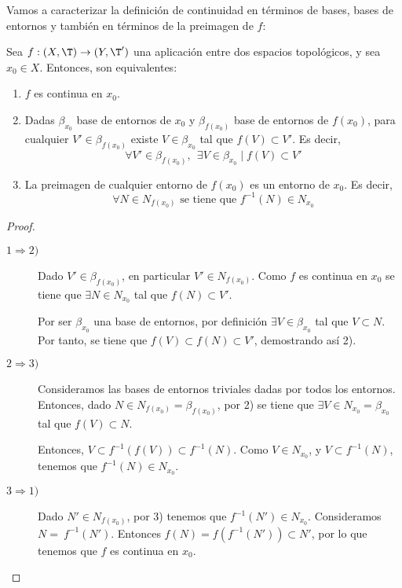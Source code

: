 Vamos a caracterizar la definición de continuidad en términos de bases, bases de entornos y también en términos de la preimagen de $f$:
\begin{prop}\label{prop:Caract_ContinuidadPto}
    Sea $f:(X,\T)\to (Y,\T')$ una aplicación entre dos espacios topológicos, y sea $x_0\in X$. Entonces, son equivalentes:
    \begin{enumerate}
        \item $f$ es continua en $x_0$.
        \item Dadas $\beta_{x_0}$ base de entornos de $x_0$ y $\beta_{f(x_0)}$ base de entornos de $f(x_0)$, para cualquier $V'\in \beta_{f(x_0)}$ existe $V\in \beta_{x_0}$ tal que $f(V)\subset V'$. Es decir,
        \begin{equation*}
            \forall V'\in \beta_{f(x_0)},~~\exists V\in \beta_{x_0} \mid f(V)\subset V'
        \end{equation*}
        \item La preimagen de cualquier entorno de $f(x_0)$ es un entorno de $x_0$. Es decir,
        \begin{equation*}
            \forall N\in N_{f(x_0)}\text{ se tiene que } f^{-1}(N)\in N_{x_0}
        \end{equation*}
    \end{enumerate}
\end{prop}
\begin{proof}\
    \begin{description}
        \item[$1\Longrightarrow 2)$] Dado $V'\in \beta_{f(x_0)}$, en particular $V'\in N_{f(x_0)}$. Como $f$ es continua en $x_0$ se tiene que $\exists N\in N_{x_0}$ tal que $f(N)\subset V'$. 
        
        Por ser $\beta_{x_0}$ una base de entornos, por definición $\exists V\in \beta_{x_0}$ tal que $V\subset N$. Por tanto, se tiene que $f(V)\subset f(N)\subset V'$, demostrando así 2).
    
        \item[$2\Longrightarrow 3)$] Consideramos las bases de entornos triviales dadas por todos los entornos. Entonces, dado $N\in N_{f(x_0)}=\beta_{f(x_0)}$, por 2) se tiene que $\exists V\in N_{x_0}=\beta_{x_0}$ tal que $f(V)\subset N$.
        
        Entonces, $V\subset f^{-1}(f(V))\subset f^{-1}(N)$. Como $V\in N_{x_0}$, y $V\subset f^{-1}(N)$, tenemos que $f^{-1}(N)\in N_{x_0}$.

        \item[$3\Longrightarrow 1)$] Dado $N'\in N_{f(x_0)}$, por 3) tenemos que $f^{-1}(N')\in N_{x_0}$. Consideramos $N=~f^{-1}(N')$. Entonces $f(N)=f(f^{-1}(N'))\subset N'$, por lo que tenemos que $f$ es continua en $x_0$.
    \end{description}
\end{proof}


